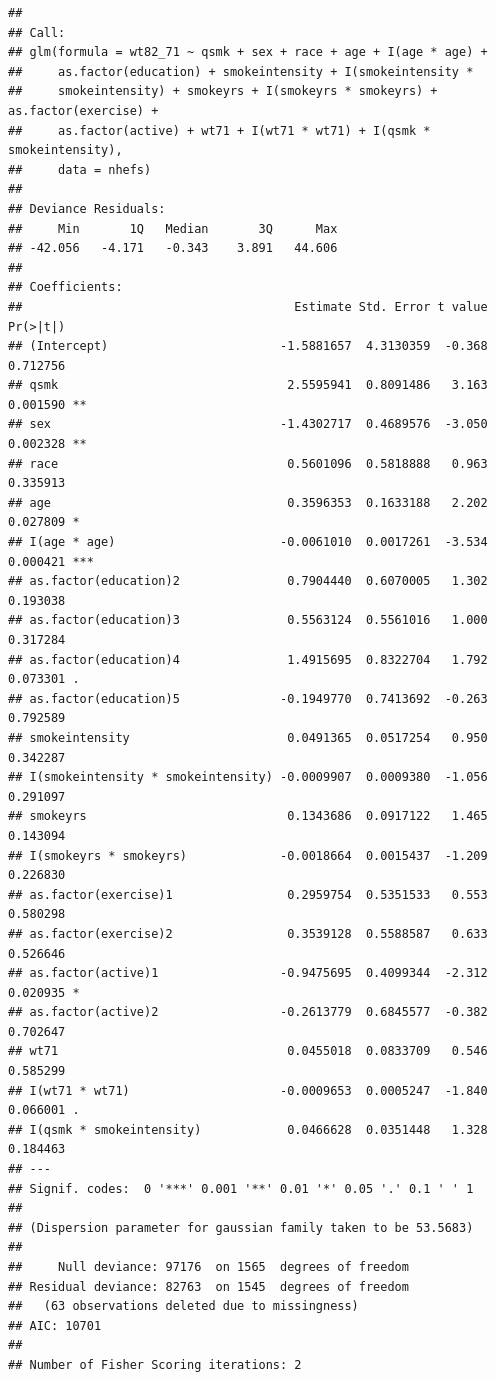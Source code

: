 \documentclass[
  10pt,
]{book}
\begin{document}
\begin{verbatim}
## 
## Call:
## glm(formula = wt82_71 ~ qsmk + sex + race + age + I(age * age) + 
##     as.factor(education) + smokeintensity + I(smokeintensity * 
##     smokeintensity) + smokeyrs + I(smokeyrs * smokeyrs) + as.factor(exercise) + 
##     as.factor(active) + wt71 + I(wt71 * wt71) + I(qsmk * smokeintensity), 
##     data = nhefs)
## 
## Deviance Residuals: 
##     Min       1Q   Median       3Q      Max  
## -42.056   -4.171   -0.343    3.891   44.606  
## 
## Coefficients:
##                                      Estimate Std. Error t value Pr(>|t|)    
## (Intercept)                        -1.5881657  4.3130359  -0.368 0.712756    
## qsmk                                2.5595941  0.8091486   3.163 0.001590 ** 
## sex                                -1.4302717  0.4689576  -3.050 0.002328 ** 
## race                                0.5601096  0.5818888   0.963 0.335913    
## age                                 0.3596353  0.1633188   2.202 0.027809 *  
## I(age * age)                       -0.0061010  0.0017261  -3.534 0.000421 ***
## as.factor(education)2               0.7904440  0.6070005   1.302 0.193038    
## as.factor(education)3               0.5563124  0.5561016   1.000 0.317284    
## as.factor(education)4               1.4915695  0.8322704   1.792 0.073301 .  
## as.factor(education)5              -0.1949770  0.7413692  -0.263 0.792589    
## smokeintensity                      0.0491365  0.0517254   0.950 0.342287    
## I(smokeintensity * smokeintensity) -0.0009907  0.0009380  -1.056 0.291097    
## smokeyrs                            0.1343686  0.0917122   1.465 0.143094    
## I(smokeyrs * smokeyrs)             -0.0018664  0.0015437  -1.209 0.226830    
## as.factor(exercise)1                0.2959754  0.5351533   0.553 0.580298    
## as.factor(exercise)2                0.3539128  0.5588587   0.633 0.526646    
## as.factor(active)1                 -0.9475695  0.4099344  -2.312 0.020935 *  
## as.factor(active)2                 -0.2613779  0.6845577  -0.382 0.702647    
## wt71                                0.0455018  0.0833709   0.546 0.585299    
## I(wt71 * wt71)                     -0.0009653  0.0005247  -1.840 0.066001 .  
## I(qsmk * smokeintensity)            0.0466628  0.0351448   1.328 0.184463    
## ---
## Signif. codes:  0 '***' 0.001 '**' 0.01 '*' 0.05 '.' 0.1 ' ' 1
## 
## (Dispersion parameter for gaussian family taken to be 53.5683)
## 
##     Null deviance: 97176  on 1565  degrees of freedom
## Residual deviance: 82763  on 1545  degrees of freedom
##   (63 observations deleted due to missingness)
## AIC: 10701
## 
## Number of Fisher Scoring iterations: 2
\end{verbatim}
\end{document}
